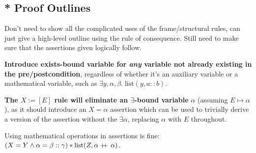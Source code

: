 \documentclass[a4paper, 11pt]{article}
\newcommand{\doubleplus}{+\kern-1.3ex+\kern0.8ex}
\begin{document}
{    \subsection*{* Proof Outlines}
    {
        Don't need to show all the complicated uses of the frame/structural rules, can just give a high-level outline using the rule of consequence. Still need to make sure that the assertions given logically follow.

        \textbf{Introduce exists-bound variable for \textit{any} variable not already existing in the pre/postcondition}, regardless of whether it's an auxiliary variable or a mathematical variable, such as \(\exists y,\alpha,\beta.\;\text{list}(y,a::b)\).

        \textbf{The \(X := [E]\) rule will eliminate an \(\exists\)-bound variable} \(\alpha\) (assuming \(E\mapsto\alpha\)), as it should introduce an \(X=\alpha\) assertion which can be used to trivially derive a version of the assertion without the \(\exists\alpha\), replacing \(\alpha\) with \(E\) throughout.

        Using mathematical operations in assertions is fine: \((X = Y \wedge \alpha = \beta :: \gamma) * \text{list}(Z, \alpha \doubleplus \alpha)\).

}}
\end{document}
